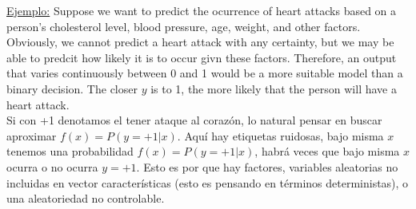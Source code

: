 \documentclass[11pt,a4paper]{article}
\theoremstyle{definition}
\begin{document}
	\underline{Ejemplo:} Suppose we want to predict the ocurrence of heart attacks based on a person's cholesterol level, blood pressure, age, weight, and other factors. Obviously, we cannot predict a heart attack with any certainty, but we may be able to predcit how likely it is to occur givn these factors. Therefore, an output that varies continuously between 0 and 1 would be a more suitable model than a binary decision. The closer $y$ is to 1, the more likely that the person will have a heart attack.\\
	
	Si con +1 denotamos el tener ataque al corazón, lo natural pensar en buscar aproximar $f(x)=P(y=+1|x)$. Aquí hay etiquetas ruidosas, bajo misma $x$ tenemos una probabilidad $f(x)=P(y=+1|x)$, habrá veces que bajo misma $x$ ocurra o no ocurra $y=+1$. Esto es por que hay factores, variables aleatorias no incluidas en vector características (esto es pensando en términos deterministas), o una aleatoriedad no controlable.\\
	
\end{document}
